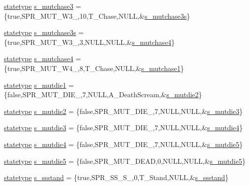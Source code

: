 \begin{DoxyCompactItemize}
\item 
\hyperlink{structstatestruct}{statetype} \hyperlink{WL__ACT2_8C_a06932e0533b7423e4adc7d2adf58e406}{s\_\-mutchase3} = \{true,SPR\_\-MUT\_\-W3\_,10,T\_\-Chase,NULL,\&\hyperlink{WL__ACT2_8C_a57ee31e6b085b74ed1dc9d5d3fa69acd}{s\_\-mutchase3s}\}
\item 
\hyperlink{structstatestruct}{statetype} \hyperlink{WL__ACT2_8C_a57ee31e6b085b74ed1dc9d5d3fa69acd}{s\_\-mutchase3s} = \{true,SPR\_\-MUT\_\-W3\_,3,NULL,NULL,\&\hyperlink{WL__ACT2_8C_a56eae46ddd14949ac6e994498cf45d02}{s\_\-mutchase4}\}
\item 
\hyperlink{structstatestruct}{statetype} \hyperlink{WL__ACT2_8C_a56eae46ddd14949ac6e994498cf45d02}{s\_\-mutchase4} = \{true,SPR\_\-MUT\_\-W4\_,8,T\_\-Chase,NULL,\&\hyperlink{WL__DEF_8H_a5ee8dc5541dc82612a2a7e5ea048fa00}{s\_\-mutchase1}\}
\item 
\hyperlink{structstatestruct}{statetype} \hyperlink{WL__ACT2_8C_a2af253b4fd1ed084c59d184f2bd6ac9a}{s\_\-mutdie1} = \{false,SPR\_\-MUT\_\-DIE\_,7,NULL,A\_\-DeathScream,\&\hyperlink{WL__ACT2_8C_a62e3ae61dabb73967fe34eee93e9ca96}{s\_\-mutdie2}\}
\item 
\hyperlink{structstatestruct}{statetype} \hyperlink{WL__ACT2_8C_a62e3ae61dabb73967fe34eee93e9ca96}{s\_\-mutdie2} = \{false,SPR\_\-MUT\_\-DIE\_,7,NULL,NULL,\&\hyperlink{WL__ACT2_8C_a2c018e0b0460afd987ad8350890f7086}{s\_\-mutdie3}\}
\item 
\hyperlink{structstatestruct}{statetype} \hyperlink{WL__ACT2_8C_a2c018e0b0460afd987ad8350890f7086}{s\_\-mutdie3} = \{false,SPR\_\-MUT\_\-DIE\_,7,NULL,NULL,\&\hyperlink{WL__ACT2_8C_a0850aed795c6485f08f69e67f4c71190}{s\_\-mutdie4}\}
\item 
\hyperlink{structstatestruct}{statetype} \hyperlink{WL__ACT2_8C_a0850aed795c6485f08f69e67f4c71190}{s\_\-mutdie4} = \{false,SPR\_\-MUT\_\-DIE\_,7,NULL,NULL,\&\hyperlink{WL__ACT2_8C_a9fec43fc0f6b3c9739a2d19440039ba9}{s\_\-mutdie5}\}
\item 
\hyperlink{structstatestruct}{statetype} \hyperlink{WL__ACT2_8C_a9fec43fc0f6b3c9739a2d19440039ba9}{s\_\-mutdie5} = \{false,SPR\_\-MUT\_\-DEAD,0,NULL,NULL,\&\hyperlink{WL__ACT2_8C_a9fec43fc0f6b3c9739a2d19440039ba9}{s\_\-mutdie5}\}
\item 
\hyperlink{structstatestruct}{statetype} \hyperlink{WL__ACT2_8C_af5abcc33c0e26090b5e4c3e516bc5241}{s\_\-ssstand} = \{true,SPR\_\-SS\_\-S\_,0,T\_\-Stand,NULL,\&\hyperlink{WL__ACT2_8C_af5abcc33c0e26090b5e4c3e516bc5241}{s\_\-ssstand}\}
\item 

\end{DoxyCompactItemize}
